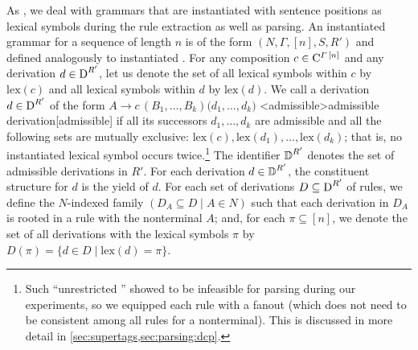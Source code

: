 \documentclass[../../document.tex]{subfiles}
\begin{document}
    As , we deal with  grammars that are instantiated with sentence positions as lexical symbols during the rule extraction as well as parsing.
    An instantiated  grammar for a sequence of length \(n\) is of the form \((N, \varGamma, [n], S, R')\) and defined analogously to instantiated .
    For any composition \(c \in \mathrm{C}^{\varGamma\,[n]}\) and any derivation \(d \in \operatorname{D}^{R'}\), let us denote the set of all lexical symbols within \(c\) by \(\mathrm{lex}(c)\) and all lexical symbols within \(d\) by \(\mathrm{lex}(d)\).
    We call a derivation \(d \in \operatorname{D}^{R'}\) of the form \(A \to c\,(B_1, \ldots, B_k) \big( d_1, \ldots, d_k \big)\) <admissible>{admissible  derivation}[admissible] if all its successors \(d_1, \ldots, d_k\) are admissible and all the following sets are mutually exclusive: \(\mathrm{lex}(c), \mathrm{lex}(d_1), \ldots, \mathrm{lex}(d_k)\); that is, no instantiated lexical symbol occurs twice.\footnote{
        Such ``unrestricted '' showed to be infeasible for parsing during our experiments, so we equipped each rule with a fanout (which does not need to be consistent among all rules for a  nonterminal).
        This is discussed in more detail in \cref{sec:supertags,sec:parsing:dcp}.
    }
    The identifier \(\operatorname{\mathbb{D}}^{R'}\) denotes the set of admissible derivations in \(R'\).
    For each derivation \(d \in \operatorname{\mathbb{D}}^{R'}\), the constituent structure for \(d\) is the yield of \(d\).
    For each set of derivations \(D \subseteq \operatorname{D}^{R'}\) of  rules, we define the \(N\)-indexed family \((D_A \subseteq D \mid A \in N)\) such that each derivation in \(D_A\) is rooted in a rule with the  nonterminal \(A\); and, for each \(\pi \subseteq [n]\), we denote the set of all derivations with the lexical symbols \(\pi\) by \(D(\pi) = \{d\in D \mid \mathrm{lex}(d) = \pi\}\).
\end{document}
